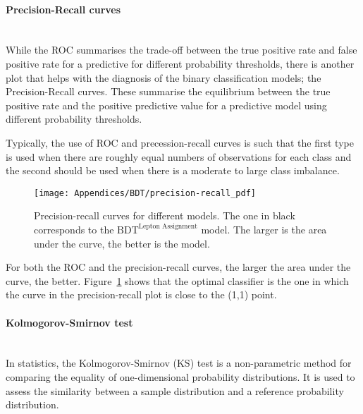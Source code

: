 
\paragraph{Precision-Recall curves}\mbox{}\\
While the ROC summarises the trade-off between 
the true positive rate and false positive rate for a predictive 
for different probability thresholds, there is another plot that helps
with the diagnosis of the binary classification models; the Precision-Recall curves.
These summarise the equilibrium between the true positive rate and 
the positive predictive value for a predictive model using different probability thresholds.

Typically, the use of ROC and precession-recall curves is such that the first type is used
when there are roughly equal numbers of observations for each class and
the second should be used when there is a moderate to large class imbalance.

\begin{figure}[h]
\centering
  \centering
  \texttt{[image: Appendices/BDT/precision-recall\_pdf]}
\caption{Precision-recall curves for different models. The one in black corresponds to the
$\text{BDT}^{\text{Lepton Assignment}}$ model. The larger is the area under the curve,
the better is the model.}
\label{fig:Appendix:BDT:precision-recallCurve}
\end{figure}

For both the ROC and the precision-recall curves, the larger the area under the curve, the better.
Figure~\ref{fig:Appendix:BDT:precision-recallCurve} shows that the optimal classifier is the one in 
which the curve in the precision-recall plot is close to the (1,1) point.


\paragraph{Kolmogorov-Smirnov test}\mbox{}\\
In statistics, the Kolmogorov-Smirnov (KS) test is a non-parametric method for comparing the equality 
of one-dimensional probability distributions. It is used to assess the similarity between 
a sample distribution and a reference probability distribution.

